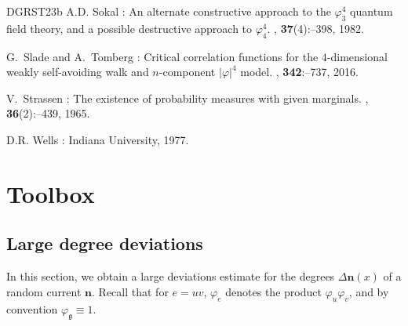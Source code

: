 \documentclass[11pt,a4paper]{article}
\theoremstyle{definition}
\numberwithin{equation}{section}
\newcommand\n{\mathbf{n}}
\newcommand\fg{\mathfrak{g}}
\begin{document}
\begin{thebibliography}{DGRST23b}
A.D. \bgroup\fonteauteurs\bgroup Sokal\egroup\egroup{} :
\newblock An alternate constructive approach to the $\varphi^4_3$ quantum field theory, and a possible destructive approach to $\varphi^4_4$.
, \textup{\textbf{37}}(4)\string:--398, 1982.

G.~\bgroup\fonteauteurs\bgroup Slade\egroup\egroup{} and A.~\bgroup\fonteauteurs\bgroup Tomberg\egroup\egroup{} :
\newblock Critical correlation functions for the $4$-dimensional weakly self-avoiding walk and $n$-component $|\varphi|^4$ model.
, \textbf{342}\string:--737, 2016.


V.~\bgroup\fonteauteurs\bgroup Strassen\egroup\egroup{} :
\newblock The existence of probability measures with given marginals.
, \textbf{36}(2)\string:--439, 1965.

D.R. \bgroup\fonteauteurs\bgroup Wells\egroup\egroup{} :
\newblock Indiana University, 1977.



\end{thebibliography}






\appendix 


\section{Toolbox}


\subsection{Large degree deviations}

In this section, we obtain a large deviations estimate for the degrees $\Delta{\n}(x)$ of a random current $\n$. Recall that for $e=uv$, $\varphi_e$ denotes the product $\varphi_u\varphi_v$, and by convention $\varphi_{\fg}\equiv 1$.
\end{document}
